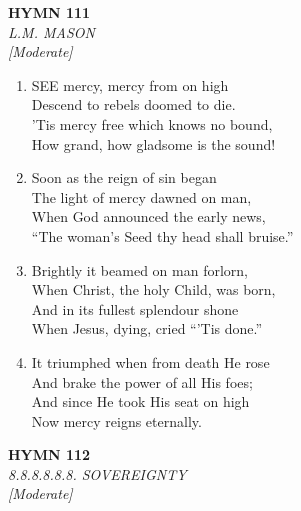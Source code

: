\newpage
\begin{center}
    {\Large \textbf{HYMN 111}}
    \\
    \textit{L.M. MASON}
    \\
    \textit{\small [Moderate]}
\end{center}
\vspace{1em}

\begin{enumerate}
    \item SEE mercy, mercy from on high \\
        Descend to rebels doomed to die. \\
        'Tis mercy free which knows no bound, \\
        How grand, how gladsome is the sound!

    \item Soon as the reign of sin began \\
        The light of mercy dawned on man, \\
        When God announced the early news, \\
        ``The woman's Seed thy head shall bruise.''

    \item Brightly it beamed on man forlorn, \\
        When Christ, the holy Child, was born, \\
        And in its fullest splendour shone \\
        When Jesus, dying, cried ``'Tis done.''

    \item It triumphed when from death He rose \\
        And brake the power of all His foes; \\
        And since He took His seat on high \\
        Now mercy reigns eternally.

\end{enumerate}

\newpage
\begin{center}
    {\Large \textbf{HYMN 112}}
    \\
    \textit{8.8.8.8.8.8. SOVEREIGNTY}
    \\
    \textit{\small [Moderate]}
\end{center}
\vspace{1em}

